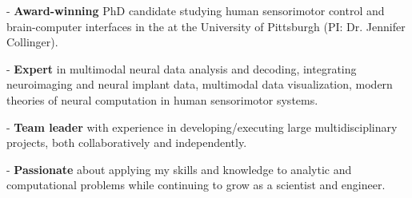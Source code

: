 \vspace*{-0.5cm}

\begin{cvparagraph}
- \textbf{Award-winning} PhD candidate studying human sensorimotor control and brain-computer interfaces in the  at the University of Pittsburgh (PI: Dr. Jennifer Collinger). 

- \textbf{Expert} in multimodal neural data analysis and decoding, integrating neuroimaging and neural implant data, multimodal data visualization, modern theories of neural computation in human sensorimotor systems.

- \textbf{Team leader} with experience in developing/executing large multidisciplinary projects, both collaboratively and independently.

- \textbf{Passionate} about applying my skills and knowledge to analytic and computational problems while continuing to grow as a scientist and engineer.
\vspace*{-0.6cm}
\end{cvparagraph}
